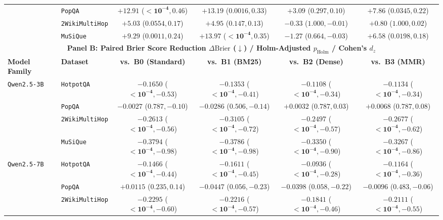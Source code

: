 \documentclass[11pt]{article}
\begin{document}
\begin{table}[t]
{\begin{tabular}{llcccc}
& \texttt{PopQA} & $\mathbf{+12.91}$ ($\mathbf{<10^{-4}}, 0.46$) & $\mathbf{+13.19}$ ($\mathbf{0.0016}, 0.33$) & $+3.09$ ($0.297, 0.10$) & $\mathbf{+7.86}$ ($\mathbf{0.0345}, 0.22$) \\
& \texttt{2WikiMultiHop} & $+5.03$ ($0.0554, 0.17$) & $+4.95$ ($0.147, 0.13$) & $-0.33$ ($1.000, -0.01$) & $+0.80$ ($1.000, 0.02$) \\
& \texttt{MuSiQue} & $\mathbf{+9.29}$ ($\mathbf{0.0011}, 0.24$) & $\mathbf{+13.97}$ ($\mathbf{<10^{-4}}, 0.35$) & $-1.27$ ($0.664, -0.03$) & $\mathbf{+6.58}$ ($\mathbf{0.0198}, 0.18$) \\
\midrule
\midrule
\multicolumn{6}{c}{\textbf{Panel B: Paired Brier Score Reduction $\Delta\text{Brier}$ ($\downarrow$) / Holm-Adjusted $p_{\text{Holm}}$ / Cohen's $d_z$}} \\
\midrule
\textbf{Model Family} & \textbf{Dataset} & \textbf{vs.\ B0 (Standard)} & \textbf{vs.\ B1 (BM25)} & \textbf{vs.\ B2 (Dense)} & \textbf{vs.\ B3 (MMR)} \\
\midrule
\multirow{4}{*}{\texttt{Qwen2.5-3B}}
& \texttt{HotpotQA} & $\mathbf{-0.1650}$ ($\mathbf{<10^{-4}}, -0.53$) & $\mathbf{-0.1353}$ ($\mathbf{<10^{-4}}, -0.41$) & $\mathbf{-0.1108}$ ($\mathbf{<10^{-4}}, -0.34$) & $\mathbf{-0.1134}$ ($\mathbf{<10^{-4}}, -0.34$) \\
& \texttt{PopQA} & $-0.0027$ ($0.787, -0.10$) & $-0.0286$ ($0.506, -0.14$) & $+0.0032$ ($0.787, 0.03$) & $+0.0068$ ($0.787, 0.08$) \\
& \texttt{2WikiMultiHop} & $\mathbf{-0.2613}$ ($\mathbf{<10^{-4}}, -0.56$) & $\mathbf{-0.3105}$ ($\mathbf{<10^{-4}}, -0.72$) & $\mathbf{-0.2497}$ ($\mathbf{<10^{-4}}, -0.57$) & $\mathbf{-0.2677}$ ($\mathbf{<10^{-4}}, -0.62$) \\
& \texttt{MuSiQue} & $\mathbf{-0.3794}$ ($\mathbf{<10^{-4}}, -0.98$) & $\mathbf{-0.3786}$ ($\mathbf{<10^{-4}}, -0.98$) & $\mathbf{-0.3350}$ ($\mathbf{<10^{-4}}, -0.90$) & $\mathbf{-0.3267}$ ($\mathbf{<10^{-4}}, -0.86$) \\
\midrule
\multirow{4}{*}{\texttt{Qwen2.5-7B}}
& \texttt{HotpotQA} & $\mathbf{-0.1466}$ ($\mathbf{<10^{-4}}, -0.44$) & $\mathbf{-0.1611}$ ($\mathbf{<10^{-4}}, -0.45$) & $\mathbf{-0.0936}$ ($\mathbf{<10^{-4}}, -0.28$) & $\mathbf{-0.1164}$ ($\mathbf{<10^{-4}}, -0.36$) \\
& \texttt{PopQA} & $+0.0115$ ($0.235, 0.14$) & $-0.0447$ ($0.056, -0.23$) & $-0.0398$ ($0.058, -0.22$) & $-0.0096$ ($0.483, -0.06$) \\
& \texttt{2WikiMultiHop} & $\mathbf{-0.2295}$ ($\mathbf{<10^{-4}}, -0.60$) & $\mathbf{-0.2216}$ ($\mathbf{<10^{-4}}, -0.57$) & $\mathbf{-0.1841}$ ($\mathbf{<10^{-4}}, -0.46$) & $\mathbf{-0.2111}$ ($\mathbf{<10^{-4}}, -0.55$) \\

\end{tabular}}
\end{table}
\end{document}
